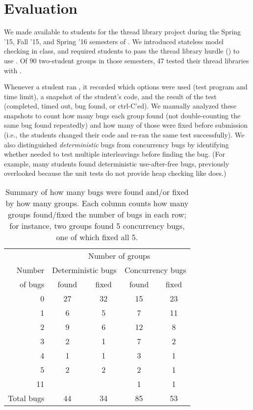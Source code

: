 \section{Evaluation}
\label{sec:eval}

We made \landslide available to students for the thread library project
during the Spring '15, Fall '15, and Spring '16 semesters of \fourten.
We introduced stateless model checking in class, %
and required students to pass the thread library hurdle (\sect{\ref{sec:grading}}) to use \landslide.
Of 90 two-student groups in those semesters, 47 tested their thread libraries with \landslide.

Whenever a student ran \landslide,
it recorded which options were used (test program and time limit),
a snapshot of the student's code,
and the result of the test (completed, timed out, bug found, or ctrl-C'ed).
%
We manually analyzed these snapshots to count how many bugs each group found
(not double-counting the same bug found repeatedly)
and how many of those were fixed before submission
(i.e., the students changed their code and re-ran the same test successfully).
%
We also distinguished {\em deterministic} bugs from concurrency bugs
by identifying whether \landslide needed to test multiple interleavings before finding the bug.
(For example, many students found deterministic use-after-free bugs,
previously overlooked because the unit tests do not provide heap checking like \landslide does.)

\begin{table}[t]
	\begin{center}
	\begin{tabular}{r|cc|cc}
	& \multicolumn{4}{c}{Number of groups} \\
	Number & \multicolumn{2}{c|}{Deterministic bugs} & \multicolumn{2}{c}{Concurrency bugs} \\
	of bugs	& found & fixed & found & fixed \\
	\hline
	0	& 27	& 32	& 15	& 23	\\
	1	& 6	& 5	& 7	& 11	\\
	2	& 9	& 6	& 12	& 8	\\
	3	& 2	& 1	& 7	& 2	\\
	4	& 1	& 1	& 3	& 1	\\
	5	& 2	& 2	& 2	& 1	\\
	11	& 	& 	& 1	& 1	\\
	\hline
	Total bugs
		& 44	& 34	& 85	& 53	\\
	\end{tabular}
	\end{center}
	\caption{Summary of how many bugs were found and/or fixed by how many groups.
	Each column counts how many groups found/fixed the number of bugs in each row;
	for instance, two groups found 5 concurrency bugs, one of which fixed all 5.}
	\label{tab:this-table-sucks-but-it's-the-best-i-got}
\end{table}

